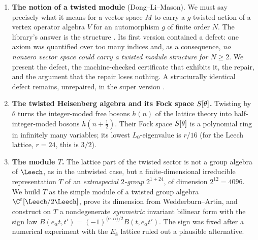 \begin{enumerate}[label=(\Roman*)]
\item \textbf{The notion of a twisted module} (Dong--Li--Mason).  We must say precisely what it
  means for a vector space $M$ to carry a $g$-twisted action of a vertex operator algebra $V$ for
  an automorphism $g$ of finite order $N$.  The library's answer is the structure
  .  Its first version contained a defect: one axiom was quantified over
  too many indices and, as a consequence, \emph{no nonzero vector space could carry a twisted
  module structure for $N\ge 2$}.  We present the defect, the machine-checked certificate that
  exhibits it, the repair, and the argument that the repair loses nothing.  A structurally
  identical defect remains, unrepaired, in the super version .
\item \textbf{The twisted Heisenberg algebra and its Fock space $S[\theta]$.}  Twisting by $\theta$
  turns the integer-moded free bosons $h(n)$ of the lattice theory into half-integer-moded bosons
  $h(n+\tfrac12)$.  Their Fock space $S[\theta]$ is a polynomial ring in infinitely many variables;
  its lowest $L_0$-eigenvalue is $r/16$ (for the Leech lattice, $r=24$, this is $3/2$).
\item \textbf{The module $T$.}  The lattice part of the twisted sector is not a group algebra of
  $\Leech$, as in the untwisted case, but a finite-dimensional irreducible representation $T$ of an
  \emph{extraspecial $2$-group} $2^{1+24}$, of dimension $2^{12}=4096$.  We build $T$ as the simple
  module of a twisted group algebra $\C^\chsixeps[\Leech/2\Leech]$, prove its dimension from
  Wedderburn--Artin, and construct on $T$ a nondegenerate \emph{symmetric} invariant bilinear form
  with the sign law $B(e_\alpha t,t') = (-1)^{\langle\alpha,\alpha\rangle/2}B(t,e_\alpha t')$.  The
  sign was fixed after a numerical experiment with the $E_8$ lattice ruled out a plausible
  alternative.
\end{enumerate}

